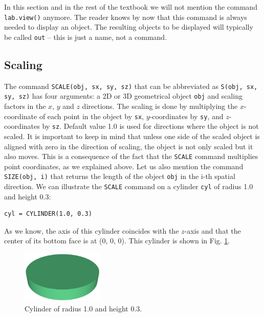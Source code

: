 \begin{gbox}
In this section and in the rest of the textbook we will not mention the command
{\tt lab.view()} anymore. The reader knows by now that this command is always needed 
to display an object. The resulting objects to be displayed will 
typically be called {\tt out} -- this is just a name, not a command.
\end{gbox}


\subsection{Scaling}

The command {\tt SCALE(obj, sx, sy, sz)} that can be abbreviated as 
{\tt S(obj, sx, sy, sz)} has four arguments: a 2D or 3D geometrical object {\tt obj} 
and scaling factors in the $x$, $y$ and $z$ directions. The scaling is done by
multiplying the $x$-coordinate of each point in the object by {\tt sx}, $y$-coordinates
by {\tt sy}, and $z$-coordinates by {\tt sz}. Default value 1.0 is used for directions where 
the object is not scaled. It is important to keep in mind that unless 
one side of the scaled object is aligned with zero in the direction of scaling, 
the object is not only scaled but it also moves. This is a consequence of the 
fact that the {\tt SCALE} command multiplies point coordinates, as we explained above. 
Let us also mention the command {\tt SIZE(obj, i)} that returns the length of 
the object {\tt obj} in the i-th spatial direction.
We can illustrate the {\tt SCALE} command on a cylinder {\tt cyl} of radius 1.0 
and height 0.3:\\

\begin{bbox}
\begin{verbatim}
cyl = CYLINDER(1.0, 0.3)
\end{verbatim}
\end{bbox}
\vspace{6mm}

\noindent
As we know, the axis of this cylinder coincides with the $z$-axis 
and that the center of its bottom face is at (0, 0, 0). This cylinder is shown 
in Fig. \ref{fig:scale-0}.
\newpage

\begin{figure}[!ht]
\begin{center}
\includegraphics[width=0.35\textwidth]{img/scale-0.png}
\end{center}
\vspace{-4mm}
\caption{Cylinder of radius 1.0 and height 0.3.}
\label{fig:scale-0}
\end{figure}

